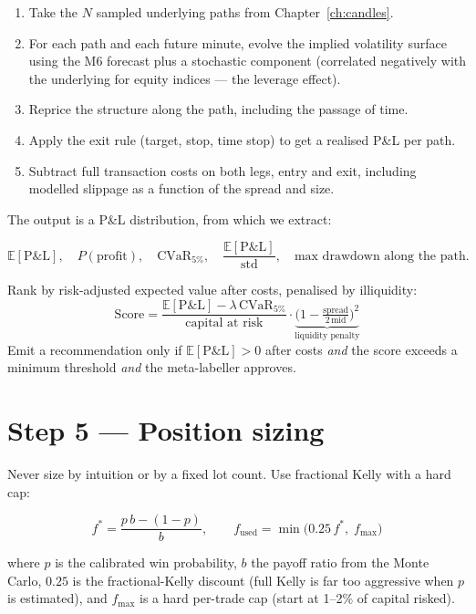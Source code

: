 \begin{enumerate}
\item Take the $N$ sampled underlying paths from Chapter~\ref{ch:candles}.
\item For each path and each future minute, evolve the implied volatility surface
using the M6 forecast plus a stochastic component (correlated negatively with
the underlying for equity indices --- the leverage effect).
\item Reprice the structure along the path, including the passage of time.
\item Apply the exit rule (target, stop, time stop) to get a realised P\&L per
path.
\item Subtract full transaction costs on both legs, entry and exit, including
modelled slippage as a function of the spread and size.
\end{enumerate}

The output is a P\&L distribution, from which we extract:

\[
\mathbb{E}[\text{P\&L}],\quad
P(\text{profit}),\quad
\text{CVaR}_{5\%},\quad
\frac{\mathbb{E}[\text{P\&L}]}{\text{std}},\quad
\text{max drawdown along the path}.
\]

\begin{keybox}[title={Ranking objective}]
Rank by risk-adjusted expected value after costs, penalised by illiquidity:
\[
\text{Score} = \frac{\mathbb{E}[\text{P\&L}] - \lambda\,\text{CVaR}_{5\%}}
{\text{capital at risk}} \cdot \underbrace{\Big(1 - \tfrac{\text{spread}}{2\,\text{mid}}\Big)^2}_{\text{liquidity penalty}}
\]
Emit a recommendation only if $\mathbb{E}[\text{P\&L}] > 0$ after costs
\emph{and} the score exceeds a minimum threshold \emph{and} the meta-labeller
approves.
\end{keybox}

\section{Step 5 --- Position sizing}

Never size by intuition or by a fixed lot count. Use fractional Kelly with a hard
cap:

\[
f^{*} = \frac{p\,b - (1-p)}{b}, \qquad
f_{\text{used}} = \min\!\Big(0.25\,f^{*},\; f_{\max}\Big)
\]

where $p$ is the calibrated win probability, $b$ the payoff ratio from the Monte
Carlo, $0.25$ is the fractional-Kelly discount (full Kelly is far too aggressive
when $p$ is estimated), and $f_{\max}$ is a hard per-trade cap (start at 1--2\%
of capital risked).

